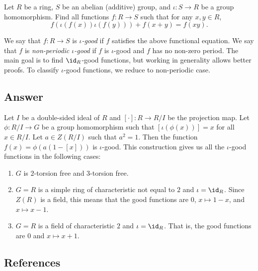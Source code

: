 Let $R$ be a ring, $S$ be an abelian (additive) group, and $\iota : S \to R$ be a group homomorphism.
Find all functions $f : R \to S$ such that for any $x, y \in R$,
\[ f(\iota(f(x)) \iota(f(y))) + f(x + y) = f(xy). \tag{*}\label{2017a6-eq0} \]

We say that $f : R \to S$ is \emph{$\iota$-good} if $f$ satisfies the above functional equation.
We say that $f$ is \emph{non-periodic $\iota$-good} if $f$ is $\iota$-good and $f$ has no non-zero period.
The main goal is to find $\id_R$-good functions, but working in generality allows better proofs.
To classify $\iota$-good functions, we reduce to non-periodic case.





\subsection*{Answer}

Let $I$ be a double-sided ideal of $R$ and $[\cdot] : R \to R/I$ be the projection map.
Let $\phi : R/I \to G$ be a group homomorphism such that $[\iota(\phi(x))] = x$ for all $x \in R/I$.
Let $a \in Z(R/I)$ such that $a^2 = 1$.
Then the function $f(x) = \phi(a(1 - [x]))$ is $\iota$-good.
This construction gives us all the $\iota$-good functions in the following cases:
\begin{enumerate}

    \item 
    $G$ is $2$-torsion free and $3$-torsion free.
    
    \item
    $G = R$ is a simple ring of characteristic not equal to $2$ and $\iota = \id_R$.
    Since $Z(R)$ is a field, this means that the good functions are $0$, $x \mapsto 1 - x$, and $x \mapsto x - 1$.
    
    \item
    $G = R$ is a field of characteristic $2$ and $\iota = \id_R$.
    That is, the good functions are $0$ and $x \mapsto x + 1$.

\end{enumerate}





\subsection*{References}

